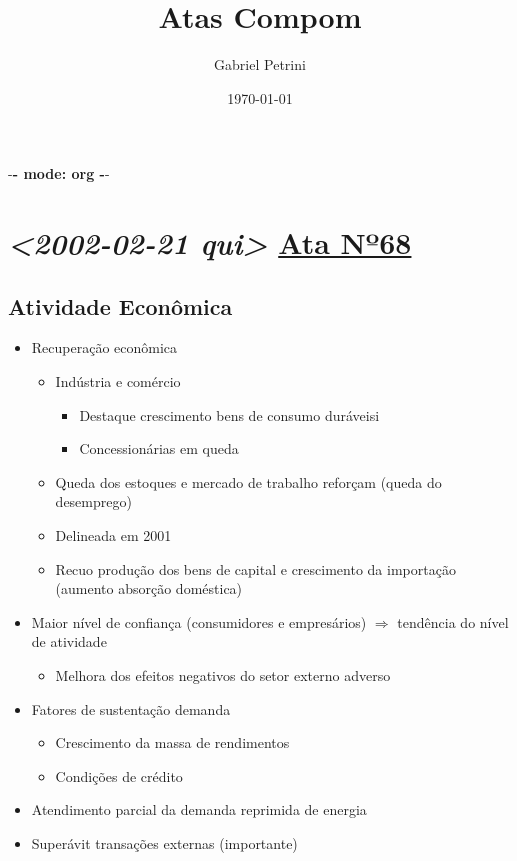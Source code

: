 \documentclass[11pt]{article}
\author{Gabriel Petrini}
\date{\today}
\title{Atas Compom}
\begin{document}
\maketitle
\tableofcontents

-\textbf{- mode: org -}-

\section*{\textit{<2002-02-21 qui> } \href{https://www.bcb.gov.br/htms/copom/not2002022068.asp?frame=1}{Ata Nº68}}
\label{sec:org78f48b3}
\subsection*{Atividade Econômica}
\label{sec:org4b7baa1}
\begin{itemize}
\item Recuperação econômica
\begin{itemize}
\item Indústria e comércio
\begin{itemize}
\item Destaque crescimento bens de consumo duráveisi
\item Concessionárias em queda
\end{itemize}
\item Queda dos estoques e mercado de trabalho reforçam (queda do desemprego)
\item Delineada em 2001
\item Recuo produção dos bens de capital e crescimento da importação (aumento absorção doméstica)
\end{itemize}
\item Maior nível de confiança (consumidores e empresários) \(\Rightarrow\) tendência do nível de atividade
\begin{itemize}
\item Melhora dos efeitos negativos do setor externo adverso
\end{itemize}
\item Fatores de sustentação demanda
\begin{itemize}
\item Crescimento da massa de rendimentos
\item Condições de crédito
\end{itemize}
\item Atendimento parcial da demanda reprimida de energia
\item Superávit transações externas (importante)
\begin{itemize}

\end{itemize}
\end{itemize}
\end{document}
